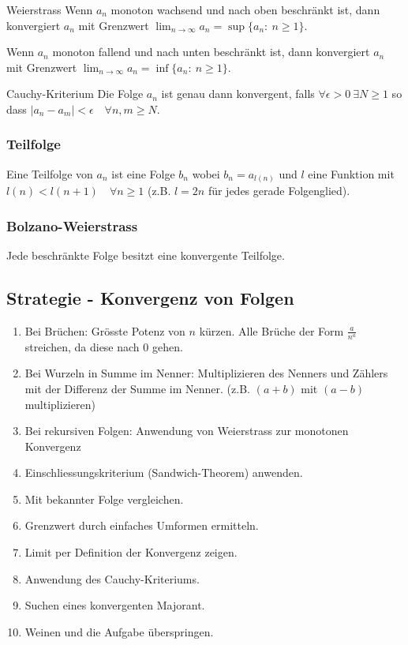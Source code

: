 \documentclass[a4paper,10pt]{article}
\def\limn{\lim_{n\to \infty}}
\begin{document}
\begin{mainbox}{Weierstrass}
Wenn $a_n$ monoton wachsend und nach oben beschränkt ist, dann konvergiert $a_n$ mit Grenzwert $\limn a_n = \sup \{a_n : \ n \ge 1\}$.

Wenn $a_n$ monoton fallend und nach unten beschränkt ist, dann konvergiert $a_n$ mit Grenzwert $\limn a_n = \inf \{a_n : \ n \ge 1\}$.
\end{mainbox}

\begin{mainbox}{Cauchy-Kriterium}
Die Folge $a_n$ ist genau dann konvergent, falls $\forall \epsilon > 0 \ \exists N \ge 1$ so dass $| a_n - a_m | < \epsilon \quad \forall n,m \ge N$.
\end{mainbox}

\subsubsection{Teilfolge}
Eine Teilfolge von $a_n$ ist eine Folge $b_n$ wobei $b_n = a_{l(n)}$ und $l$ eine Funktion mit $l(n) < l(n+1) \quad \forall n \ge 1$ (z.B. $l = 2n$ für jedes gerade Folgenglied). 

\subsubsection{Bolzano-Weierstrass}
Jede beschränkte Folge besitzt eine konvergente Teilfolge.

\subsection{Strategie - Konvergenz von Folgen}
\begin{enumerate}
 \item Bei Brüchen: Grösste Potenz von $n$ kürzen. Alle Brüche der Form $\frac{a}{n^a}$ streichen, da diese nach 0 gehen.
 \item Bei Wurzeln in Summe im Nenner: Multiplizieren des Nenners und Zählers mit der Differenz der Summe im Nenner. (z.B. $(a+b)$ mit $(a-b)$ multiplizieren)
 \item Bei rekursiven Folgen: Anwendung von Weierstrass zur monotonen Konvergenz
 \item Einschliessungskriterium (Sandwich-Theorem) anwenden.
 \item Mit bekannter Folge vergleichen.
 \item Grenzwert durch einfaches Umformen ermitteln.
 \item Limit per Definition der Konvergenz zeigen.
 \item Anwendung des Cauchy-Kriteriums.
 \item Suchen eines konvergenten Majorant.
 \item Weinen und die Aufgabe überspringen.
\end{enumerate}
\end{document}
